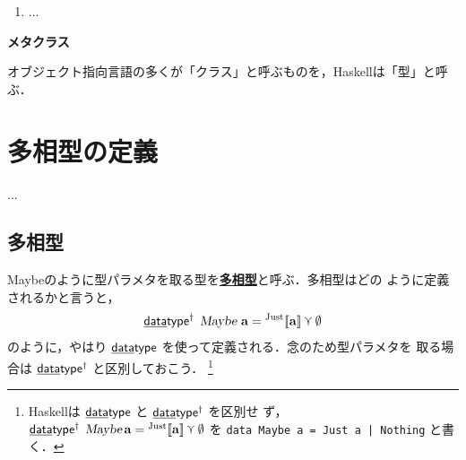 \documentclass[a5paper,twoside,fleqn,draft]{jsbook}
\def\[{[\![}
\def\]{]\!]}
\newcommand{\programminglanguage}[1]{\textsf{#1}}
\newcommand{\haskell}{\programminglanguage{Haskell}}
\newenvironment{note}[1]{\begin{boxnote}\begin{center}\textbf{#1}\end{center}}{\end{boxnote}}
\newcommand{\keyword}[1]{{\underline{\textbf{#1}}}}
\newcommand{\code}[1]{\texttt{#1}}
\newcommand{\mKeyword}[1]{\mathsf{#1}}
\newcommand{\mKeywordUnderline}[1]{\text{\underline{\textsf{#1}}}}
\newcommand{\mDataTypeKeyword}{\mKeywordUnderline{data}\mKeyword{type}}
\DeclareMathOperator{\mDataType}{\mDataTypeKeyword}
\DeclareMathOperator{\mDataTypePolymorphic}{\mDataTypeKeyword^\dagger}
\newcommand{\mNothing}{\emptyset}
\DeclareMathOperator{\mValueOr}{\curlyvee}
\newcommand{\mType}[1]{\mathbf{#1}} %
\newcommand{\mA}{\mType{a}}
\newcommand{\mTypeAssemble}[2]{{}^\mType{#1}\[\mType{#2}\]}
\newcommand{\mMaybeType}[1]{\mTypeAssemble{M}{#1}}
\newcommand{\mTypeConstructor}[1]{\textsl{#1}}
\DeclareMathOperator{\mMaybeTypeConstructor}{\mTypeConstructor{Maybe}}
\newcommand{\mValueConstructor}[1]{\mathrm{#1}}
\newcommand{\mValueWith}[2]{{}^\mValueConstructor{#1}\[#2\]}
\newcommand{\mJustWith}[1]{\mValueWith{Just}{#1}}
\begin{document}
\begin{enumerate}
\item ...
\end{enumerate}

\begin{note}{メタクラス}
オブジェクト指向言語の多くが「クラス」と呼ぶものを，\haskell は「型」と呼ぶ．


\end{note}


\chapter{多相型の定義}
\label{ch:polymorphic-data-type}
...

\section{多相型}

Maybeのように型パラメタを取る型を\keyword{多相型}と呼ぶ．多相型はどの
ように定義されるかと言うと，
\begin{equation}
  \mDataTypePolymorphic\;
  \mMaybeTypeConstructor\,\mA
  =\mJustWith{\mA}\mValueOr\mNothing
\end{equation}
のように，やはり $\mDataType$ を使って定義される．念のため型パラメタを
取る場合は $\mDataTypePolymorphic$ と区別しておこう．
\footnote{\haskell は $\mDataType$ と $\mDataTypePolymorphic$ を区別せ
  ず，$\mDataTypePolymorphic\;\mMaybeTypeConstructor\mA
  =\mJustWith{\mA }\mValueOr\mNothing$ を \code{data Maybe a = Just a
    | Nothing} と書く．}
\end{document}
